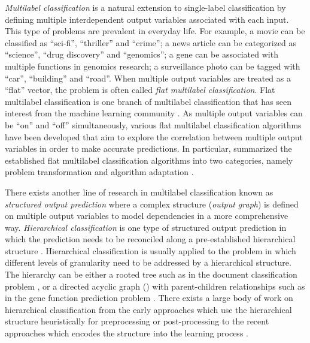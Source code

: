 \textit{Multilabel classification} is a natural extension to single-label classification by defining multiple interdependent output variables associated with each input.
This type of problems are prevalent in everyday life.
For example, a movie can be classified as ``sci-fi'', ``thriller'' and ``crime''; a news article can be categorized as ``science'', ``drug discovery'' and ``genomics''; a gene can be associated with multiple functions in genomics research; a surveillance photo can be tagged with ``car'', ``building'' and ``road''. 
When multiple output variables are treated as a ``flat'' vector, the problem is often called \textit{flat multilabel classification}.
Flat multilabel classification is one branch of multilabel classification that has seen interest from the machine learning community \citep{Tsoumakas07multi,Tsoumakas10mining}.
As multiple output variables can be ``on'' and ``off'' simultaneously, various flat multilabel classification algorithms have been developed that aim to explore the correlation between multiple output variables in order to make accurate predictions.
In particular, \citet{Tsoumakas07multi} summarized the established flat multilabel classification algorithms into two categories, namely problem transformation \citep{Zhang05a,Read09classifier,Cheng09combining} and algorithm adaptation \citep{Schapire99improved,Bian12corrlog}.


There exists another line of research in multilabel classification known as \textit{structured output prediction} where a complex structure (\textit{output graph}) is defined on multiple output variables to model dependencies in a more comprehensive way.
\textit{Hierarchical classification} is one type of structured output prediction in which the prediction needs to be reconciled along a pre-established hierarchical structure \citep{Silla11a}.
Hierarchical classification is usually applied to the problem in which different levels of granularity need to be addressed by a hierarchical structure.
The hierarchy can be either a rooted tree such as in the document classification problem \citep{Hao07hierarchicaly,Li07hierarchical,Rousu06}, or a directed acyclic graph (\daggraph) with parent-children relationships such as in the gene function prediction problem \citep{Barutcuoglu06hierarchical}.
There exists a large body of work on hierarchical classification from the early approaches which use the hierarchical structure heuristically for preprocessing or post-processing \citep{Koller97hierarchically,Dumais00Hierarchical,Liu05support,DeCoro07bayesian} to the recent approaches which encodes the structure into the learning process \citep{Cai04hierarchical,Cesabianchi05incremental,Rousu06,Gopal12bayesian}.

